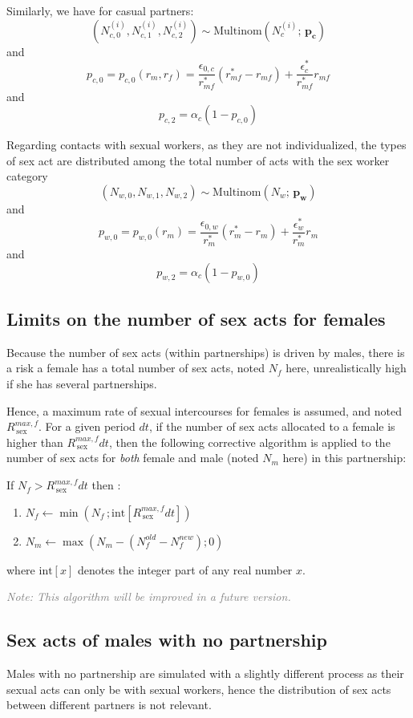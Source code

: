 \documentclass[11pt, onecolumn]{article}
\newcommand{\note}[1]{\textit{\textcolor{Grey}{Note: #1}}}
\begin{document}
Similarly, we have for casual partners:
$$\left(N^{(i)}_{c,0},N^{(i)}_{c,1},N^{(i)}_{c,2}\right) \sim \mathrm{Multinom}(N^{(i)}_c;\, \mathbf{p_c}) $$
and 
$$p_{c,0}=p_{c,0} (r_m,r_f) = \frac{\epsilon_{0,c}}{r_{mf}^*}(r_{mf}^*-r_{mf}) + \frac{\epsilon_c^*}{r_{mf}^*}r_{mf}$$ 
and
$$p_{c,2} = \alpha_c (1-p_{c,0})$$ 

Regarding contacts with sexual workers, as they are not individualized, the types of sex act are distributed among the total number of acts with the sex worker category
$$\left(N_{w,0},N_{w,1},N_{w,2}\right) \sim \mathrm{Multinom}(N_w;\, \mathbf{p_w}) $$
and
$$p_{w,0}=p_{w,0} (r_m) = \frac{\epsilon_{0,w}}{r_{m}^*}(r_{m}^*-r_{m}) + \frac{\epsilon_w^*}{r_{m}^*}r_{m}$$ 
and
$$p_{w,2} = \alpha_c (1-p_{w,0})$$ 



\subsection{Limits on the number of sex acts for females}
Because the number of sex acts (within partnerships) is driven by males, there is a risk a female has a total number of sex acts, noted $N_f$ here, unrealistically high if she has several partnerships.

Hence, a maximum rate of sexual intercourses for females is assumed, and noted $R_{\mathrm{\,sex}}^{max,f}$. For a given period $dt$, if the number of sex acts allocated to a female is higher than $R_{\mathrm{\,sex}}^{max,f}dt$, then the following corrective algorithm is applied to the number of sex acts for \emph{both} female and male (noted $N_m$ here) in this partnership:

If $N_f>R_{\mathrm{\,sex}}^{max,f}dt$ then :
\begin{enumerate}
\item $N_f \leftarrow \min\left(N_f \,; \text{int}[R_{\mathrm{\,sex}}^{max,f}dt]\right)$
\item $N_m \leftarrow \max\left(N_m - (N_f^{old}-N_f^{new}) ; 0\right)$
\end{enumerate}
where $ \text{int}[x]$ denotes the integer part of any real number $x$.

\note{This algorithm will be improved in a future version.}


\subsection{Sex acts of males with no partnership}

Males with no partnership are simulated with a slightly different process as their sexual acts can only be with sexual workers, hence the distribution of sex acts between different partners is not relevant.
\end{document}
